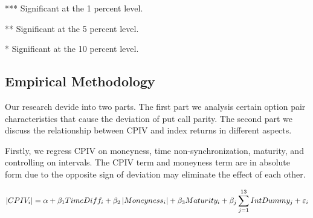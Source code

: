 \begin{table}[h]
\begin{threeparttable}
\begin{subtable}[t]{\linewidth}
\begin{tabular}{|c|cccccccccccccc}
\end{tabular}

\begin{tablenotes}
\item
\item[***]Significant at the 1 percent level.    
\item[**]Significant at the 5 percent level.   
\item[*]Significant at the 10 percent level.
\end{tablenotes}

\end{subtable}



\end{threeparttable}

\end{table}




%


\subsection{Empirical Methodology}
Our research devide into two parts. The first part we analysis certain option pair characteristics that cause the deviation of put call parity. The second part we discuss the relationship between CPIV and index returns in different aspects. 

Firstly, we regress CPIV on moneyness, time non-synchronization, maturity, and controlling on intervals. The CPIV term and moneyness term are in absolute form due to the opposite sign of deviation may eliminate the effect of each other. 

 \begin{equation}\label{eq:char}
 \footnotesize
\left | CPIV _{i} \right| = \alpha  + \beta _{1}TimeDiff_{i} + \beta _{2}\left |Moneyness_{i} \right | + \beta _{3}Maturity_{i} +  \beta _{j} \sum_{j=1}^{13}IntDummy_{j} +\varepsilon _{i}
 \end{equation}

